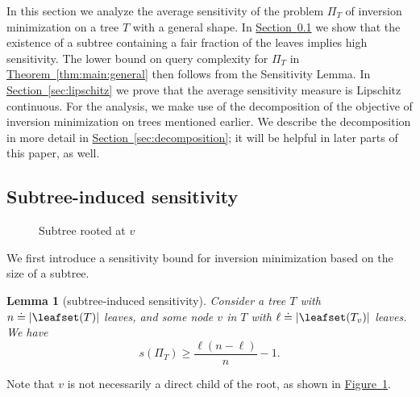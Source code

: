 \documentclass[11pt]{article}
\numberwithin{equation}{section}
\newtheorem{lemma}[theorem]{Lemma}
\theoremstyle{definition}
\theoremstyle{plain}
\newcommand{\expref}[2]{\hyperref[#2]{#1~\ref{#2}}}
\begin{document}
In this section we analyze the average sensitivity of the problem $\Pi_T$ of inversion minimization on a tree $T$ with a general shape. In \expref{Section}{sec:sensitivity:subtree} we show that the existence of a subtree containing a fair fraction of the leaves implies high sensitivity. The lower bound on query complexity for $\Pi_T$ in \expref{Theorem}{thm:main:general} then follows from the Sensitivity Lemma. In \expref{Section}{sec:lipschitz} we prove that the average sensitivity measure is Lipschitz continuous. For the analysis, we make use of the decomposition of the objective of inversion minimization on trees mentioned earlier. We describe the decomposition in more detail in \expref{Section}{sec:decomposition}; it will be helpful in later parts of this paper, as well. 

\subsection{Subtree-induced sensitivity}
\label{sec:sensitivity:subtree}

\begin{figure}
    \centering
    \caption{Subtree rooted at $v$}
    \label{fig:k-ary:subtree}
\end{figure}

We first introduce a sensitivity bound for inversion minimization based on the size of a subtree. 

\begin{lemma}[subtree-induced sensitivity]
    \label{lemma:k-ary:subtree-sensitivity}
    Consider a tree $T$ with $n \doteq \lvert\leafset(T)\rvert$ leaves, and some node $v$ in $T$ with $\ell \doteq \lvert\leafset(T_v)\rvert$ leaves. We have
    \[s(\Pi_T) \ge \frac{\ell(n-\ell)}{n}-1. \]
\end{lemma}
Note that $v$ is not necessarily a direct child of the root, as shown in \expref{Figure}{fig:k-ary:subtree}.
\end{document}
